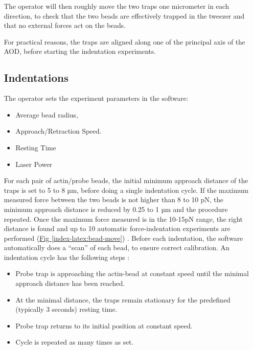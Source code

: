 \documentclass[A4paperpaper,11pt,english]{sphinxmanual}
\begin{document}
The operator will then roughly move the two traps one micrometer in each
direction, to check that the two beads are effectively trapped in the tweezer and
that no external forces act on the beads.

For practical reasons, the traps are aligned along one of the principal axis
of the AOD, before starting the indentation experiments.


\subsection{Indentations}
\label{index-latex:indentations}
The operator sets the experiment parameters in the software:
\begin{itemize}
\item {} 
Average bead radius,

\item {} 
Approach/Retraction Speed.

\item {} 
Resting Time

\item {} 
Laser Power

\end{itemize}

For each pair of actin/probe beads, the initial minimum approach distance of the
traps is set to 5 to 8 µm, before doing a single indentation cycle. If the
maximum measured force between the two beads is not higher than 8 to 10 pN, the
minimum approach distance is reduced by 0.25 to 1 µm and the procedure
repeated. Once the maximum force measured is in the 10-15pN range, the right
distance is found and up to 10 automatic force-indentation experiments are
performed (\hyperref[index-latex:bead-move]{Fig  \ref*{index-latex:bead-move}}) . Before each indentation, the software automatically does a ``scan'' of
each bead, to ensure correct calibration. An indentation cycle has the
following steps :
\begin{itemize}
\item {} 
Probe trap is approaching the actin-bead at constant speed until the minimal approach distance has been reached.

\item {} 
At the minimal distance, the traps remain stationary for the predefined (typically 3 seconds) resting time.

\item {} 
Probe trap returns to its initial position at constant speed.

\item {} 
Cycle is repeated as many times as set.

\end{itemize}
\end{document}
